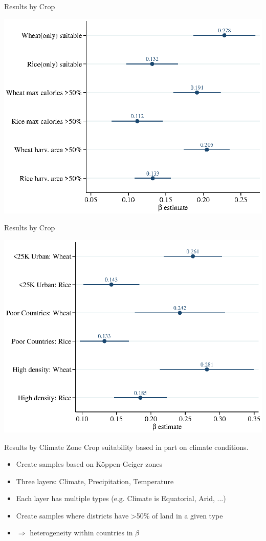 \documentclass[10pt, xcolor=dvipsnames]{beamer}
\begin{document}
\begin{frame}{Results by Crop}\label{crop}
\begin{center}
\includegraphics[width=.8\textwidth]{fig_coef_crop_base.eps}
\end{center}
\hfill \hyperlink{cropreg}{}
\end{frame}

\begin{frame}{Results by Crop}
\begin{center}
\includegraphics[width=.8\textwidth]{fig_coef_crop_sub_base.eps}
\end{center}
\end{frame}

\begin{frame}{Results by Climate Zone}
Crop suitability based in part on climate conditions. 
\begin{itemize}
  \item Create samples based on K{\"o}ppen-Geiger zones
  \item Three layers: Climate, Precipitation, Temperature
  \item Each layer has multiple types (e.g. Climate is Equatorial, Arid, ...)
  \item Create samples where districts have >50\% of land in a given type
  \item $\Rightarrow$ heterogeneity within countries in $\beta$  
\end{itemize}
\end{frame}
\end{document}
